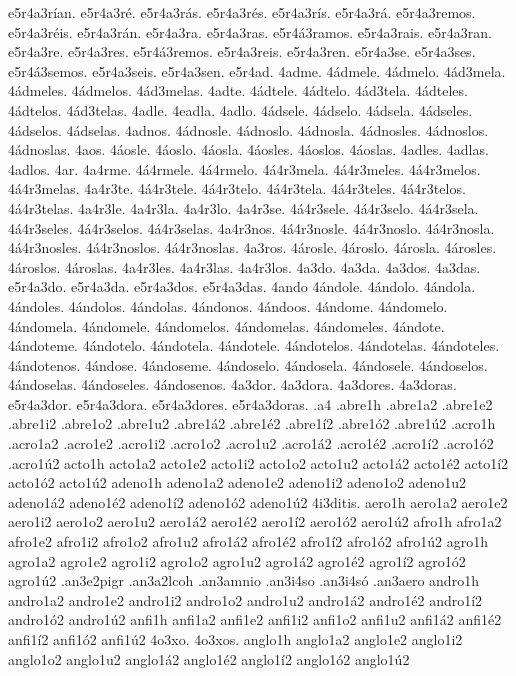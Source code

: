 {e5r4a3rían.
e5r4a3ré.
e5r4a3rás.
e5r4a3rés.
e5r4a3rís.
e5r4a3rá.
e5r4a3remos.
e5r4a3réis.
e5r4a3rán.
e5r4a3ra.
e5r4a3ras.
e5r4á3ramos.
e5r4a3rais.
e5r4a3ran.
e5r4a3re.
e5r4a3res.
e5r4á3remos.
e5r4a3reis.
e5r4a3ren.
e5r4a3se.
e5r4a3ses.
e5r4á3semos.
e5r4a3seis.
e5r4a3sen.
e5r4ad.
4adme.
4ádmele.
4ádmelo.
4ád3mela.
4ádmeles.
4ádmelos.
4ád3melas.
4adte.
4ádtele.
4ádtelo.
4ád3tela.
4ádteles.
4ádtelos.
4ád3telas.
4adle.
4eadla.
4adlo.
4ádsele.
4ádselo.
4ádsela.
4ádseles.
4ádselos.
4ádselas.
4adnos.
4ádnosle.
4ádnoslo.
4ádnosla.
4ádnosles.
4ádnoslos.
4ádnoslas.
4aos.
4áosle.
4áoslo.
4áosla.
4áosles.
4áoslos.
4áoslas.
4adles.
4adlas.
4adlos.
4ar.
4a4rme.
4á4rmele.
4á4rmelo.
4á4r3mela.
4á4r3meles.
4á4r3melos.
4á4r3melas.
4a4r3te.
4á4r3tele.
4á4r3telo.
4á4r3tela.
4á4r3teles.
4á4r3telos.
4á4r3telas.
4a4r3le.
4a4r3la.
4a4r3lo.
4a4r3se.
4á4r3sele.
4á4r3selo.
4á4r3sela.
4á4r3seles.
4á4r3selos.
4á4r3selas.
4a4r3nos.
4á4r3nosle.
4á4r3noslo.
4á4r3nosla.
4á4r3nosles.
4á4r3noslos.
4á4r3noslas.
4a3ros.
4árosle.
4ároslo.
4árosla.
4árosles.
4ároslos.
4ároslas.
4a4r3les.
4a4r3las.
4a4r3los.
4a3do.
4a3da.
4a3dos.
4a3das.
e5r4a3do.
e5r4a3da.
e5r4a3dos.
e5r4a3das.
4ando
4ándole.
4ándolo.
4ándola.
4ándoles.
4ándolos.
4ándolas.
4ándonos.
4ándoos.
4ándome.
4ándomelo.
4ándomela.
4ándomele.
4ándomelos.
4ándomelas.
4ándomeles.
4ándote.
4ándoteme.
4ándotelo.
4ándotela.
4ándotele.
4ándotelos.
4ándotelas.
4ándoteles.
4ándotenos.
4ándose.
4ándoseme.
4ándoselo.
4ándosela.
4ándosele.
4ándoselos.
4ándoselas.
4ándoseles.
4ándosenos.
4a3dor.
4a3dora.
4a3dores.
4a3doras.
e5r4a3dor.
e5r4a3dora.
e5r4a3dores.
e5r4a3doras.
.a4
.abre1h
.abre1a2 .abre1e2 .abre1i2 .abre1o2 .abre1u2
.abre1á2 .abre1é2 .abre1í2 .abre1ó2 .abre1ú2
.acro1h
.acro1a2 .acro1e2 .acro1i2 .acro1o2 .acro1u2
.acro1á2 .acro1é2 .acro1í2 .acro1ó2 .acro1ú2
acto1h
acto1a2 acto1e2 acto1i2 acto1o2 acto1u2
acto1á2 acto1é2 acto1í2 acto1ó2 acto1ú2
adeno1h
adeno1a2 adeno1e2 adeno1i2 adeno1o2 adeno1u2
adeno1á2 adeno1é2 adeno1í2 adeno1ó2 adeno1ú2
4i3ditis.
aero1h
aero1a2 aero1e2 aero1i2 aero1o2 aero1u2
aero1á2 aero1é2 aero1í2 aero1ó2 aero1ú2
afro1h
afro1a2 afro1e2 afro1i2 afro1o2 afro1u2
afro1á2 afro1é2 afro1í2 afro1ó2 afro1ú2
agro1h
agro1a2 agro1e2 agro1i2 agro1o2 agro1u2
agro1á2 agro1é2 agro1í2 agro1ó2 agro1ú2
.an3e2pigr
.an3a2lcoh
.an3amnio
.an3i4so
.an3i4só
.an3aero
andro1h
andro1a2 andro1e2 andro1i2 andro1o2 andro1u2
andro1á2 andro1é2 andro1í2 andro1ó2 andro1ú2
anfi1h
anfi1a2 anfi1e2 anfi1i2 anfi1o2 anfi1u2
anfi1á2 anfi1é2 anfi1í2 anfi1ó2 anfi1ú2
4o3xo.
4o3xos.
anglo1h
anglo1a2 anglo1e2 anglo1i2 anglo1o2 anglo1u2
anglo1á2 anglo1é2 anglo1í2 anglo1ó2 anglo1ú2
}
